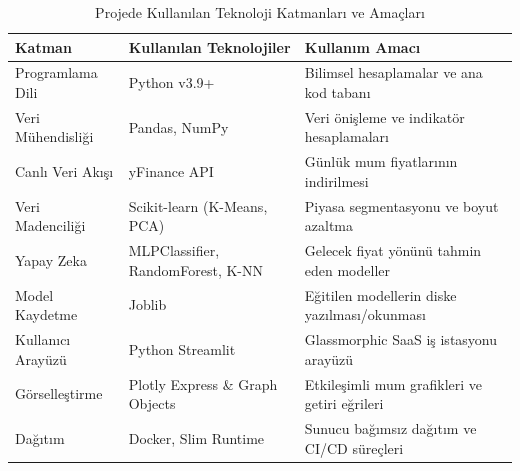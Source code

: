 \documentclass[12pt,a4paper]{report}
\begin{document}
\begin{table}[H]
    \centering
    \caption{Projede Kullanılan Teknoloji Katmanları ve Amaçları}
    \begin{tabularx}{\textwidth}{lp{5cm}X}
        \toprule
        \textbf{Katman} & \textbf{Kullanılan Teknolojiler} & \textbf{Kullanım Amacı} \\
        \midrule
        Programlama Dili & Python v3.9+ & Bilimsel hesaplamalar ve ana kod tabanı \\
        Veri Mühendisliği & Pandas, NumPy & Veri önişleme ve indikatör hesaplamaları \\
        Canlı Veri Akışı & yFinance API & Günlük mum fiyatlarının indirilmesi \\
        Veri Madenciliği & Scikit-learn (K-Means, PCA) & Piyasa segmentasyonu ve boyut azaltma \\
        Yapay Zeka & MLPClassifier, RandomForest, K-NN & Gelecek fiyat yönünü tahmin eden modeller \\
        Model Kaydetme & Joblib & Eğitilen modellerin diske yazılması/okunması \\
        Kullanıcı Arayüzü & Python Streamlit & Glassmorphic SaaS iş istasyonu arayüzü \\
        Görselleştirme & Plotly Express \& Graph Objects & Etkileşimli mum grafikleri ve getiri eğrileri \\
        Dağıtım & Docker, Slim Runtime & Sunucu bağımsız dağıtım ve CI/CD süreçleri \\
        \bottomrule
    \end{tabularx}
    \label{tab:tech_stack}
\end{table}
\end{document}
